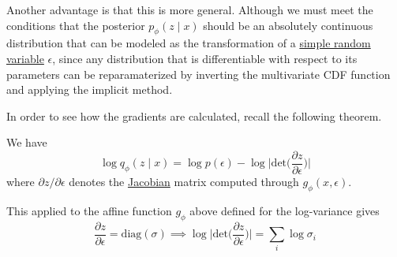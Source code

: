   Another advantage is that this is more general. Although we must meet the conditions that the posterior $p_\phi (z \mid x)$ should be an absolutely continuous distribution that can be modeled as the transformation of a \hyperref[prob-def:simple-random-variable]{simple random variable} $\epsilon$, since any distribution that is differentiable with respect to its parameters can be reparamaterized by inverting the multivariate CDF function and applying the implicit method. 

  In order to see how the gradients are calculated, recall the following theorem. 

  \begin{theorem}
    \label{thm:change-of-basis}
    We have 
    \begin{equation}
      \log q_\phi (z \mid x) = \log p(\epsilon) - \log \bigg| \mathrm{det} \bigg( \frac{\partial z}{\partial \epsilon}\bigg)\bigg| 
    \end{equation}
    where $\partial z / \partial \epsilon$ denotes the \hyperref[mv-def:jacobian]{Jacobian} matrix computed through $g_\phi(x, \epsilon)$. 
  \end{theorem}
  
  \begin{corollary}
    \label{thm:reparameterization-of-the-log-variance}
    This applied to the affine function $g_\phi$ above defined for the log-variance gives 
    \begin{equation}
      \frac{\partial z}{\partial \epsilon} = \mathrm{diag}(\sigma) \implies \log \bigg| \mathrm{det} \bigg( \frac{\partial z}{\partial \epsilon}\bigg)\bigg| = \sum_i \log \sigma_i
    \end{equation}
  \end{corollary}

